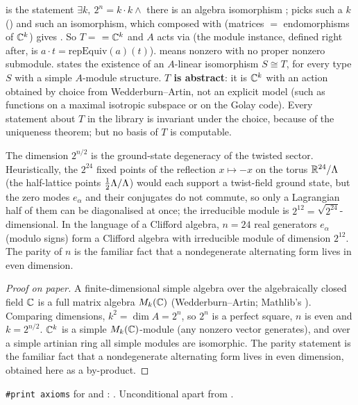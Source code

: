 \begin{dictionary}
 is the statement $\exists k,\ 2^n=k\cdot k\wedge$ there is an algebra
isomorphism ;  picks such a $k$
() and  such an isomorphism, which composed with
 (matrices $=$ endomorphisms of ${\mathbb{C}}^k$) gives .  So
$T=$  $={\mathbb{C}}^k$ and $A$ acts via  (the module instance, defined right
after, is $a\cdot t=\mathrm{repEquiv}(a)(t)$).   means nonzero with no proper
nonzero submodule.   states the existence of an
$A$-linear isomorphism $S\cong T$, for every type $S$ with a simple $A$-module structure.
\textbf{$T$ is abstract}: it is ${\mathbb{C}}^k$ with an action obtained by choice from Wedderburn--Artin, not
an explicit model (such as functions on a maximal isotropic subspace or on the Golay code).  Every
statement about $T$ in the library is invariant under the choice, because of the uniqueness
theorem; but no basis of $T$ is computable.
\end{dictionary}

\begin{physics}
The dimension $2^{n/2}$ is the ground-state degeneracy of the twisted sector. Heuristically, the $2^{24}$ fixed points of the reflection $x\mapsto-x$ on the torus $\mathbb R^{24}/{\Lambda}$ (the half-lattice points $\tfrac12{\Lambda}/{\Lambda}$) would each support a twist-field ground state, but the zero modes $e_\alpha$ and their conjugates do not commute, so only a Lagrangian half of them can be diagonalised at once; the irreducible module is $2^{12}=\sqrt{2^{24}}$-dimensional. In the language of a Clifford algebra, $n=24$ real generators $e_\alpha$ (modulo signs) form a Clifford algebra with irreducible module of dimension $2^{12}$. The parity of $n$ is the familiar fact that a nondegenerate alternating form lives in even dimension.
\end{physics}
\begin{proof}[Proof on paper]
A finite-dimensional simple algebra over the algebraically closed field ${\mathbb{C}}$ is a full matrix
algebra $M_k({\mathbb{C}})$ (Wedderburn--Artin; Mathlib's
).  Comparing dimensions,
$k^2=\dim A=2^n$, so $2^n$ is a perfect square, $n$ is even and $k=2^{n/2}$.  ${\mathbb{C}}^k$ is a simple
$M_k({\mathbb{C}})$-module (any nonzero vector generates), and over a simple artinian ring all simple modules
are isomorphic.  The parity statement  is the familiar fact that a
nondegenerate alternating form lives in even dimension, obtained here as a by-product.
\end{proof}
\begin{status}
\texttt{\#print axioms} for  and : .  Unconditional apart from .
\end{status}

